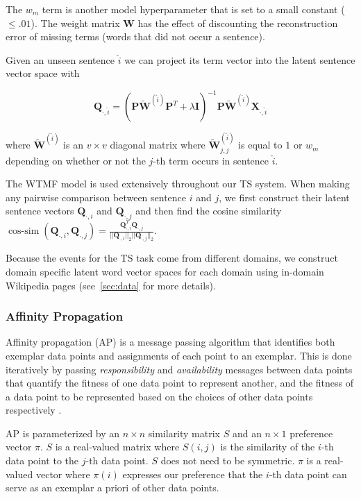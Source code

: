 The $w_m$ term is another model hyperparameter that is set to a small constant
($\le .01$). The weight matrix $\mathbf{W}$ has the effect of discounting the
reconstruction error of missing terms (words that did not occur a sentence).

Given an unseen sentence $\hat{i}$ we can project its term vector into the
latent sentence vector space with 

$$
\mathbf{Q}_{\cdot,\hat{i}} = (\mathbf{P}\mathbf{\tilde{W}}^{(\hat{i})}
\mathbf{P}^T  + \lambda\mathbf{I} )^{-1} 
\mathbf{P}\mathbf{\tilde{W}}^{(\hat{i})} \mathbf{X}_{\cdot, \hat{i}}
$$  

where $\mathbf{\tilde{W}}^{(\hat{i})}$ is an $v\times v$ diagonal matrix
where $\mathbf{\tilde{W}}^{(\hat{i})}_{j,j}$ is equal to $1$ or $w_m$ 
depending on whether or not the $j$-th term occurs in sentence $\hat{i}$.


The WTMF model is used extensively throughout our TS system. When making any 
pairwise comparison between sentence $i$ and $j$, we first construct
their latent sentence vectors $\mathbf{Q}_{\cdot,i}$ and
$\mathbf{Q}_{\cdot,j}$ and then find the cosine similarity 
$\displaystyle \operatorname{cos-sim}
(\mathbf{Q}_{\cdot,i}, \mathbf{Q}_{\cdot,j}) = 
\frac{\mathbf{Q}_{\cdot,i}^T\mathbf{Q}_{\cdot,j}}{||\mathbf{Q}_{\cdot,i}||_2
||\mathbf{Q}_{\cdot,j}||_2   }$.


Because the events for the TS task come from different domains, we construct
domain specific latent word vector spaces for each domain using in-domain 
Wikipedia pages (see~\cref{sec:data} for more details).


\subsubsection{Affinity Propagation}
Affinity propagation (AP) is a message passing algorithm that identifies both
exemplar data points and assignments of each point to an exemplar.  This is
done iteratively by passing \emph{responsibility} and \emph{availability}
messages between data points that quantify the fitness of one data point to
represent another, and the fitness of a data point to be represented based on
the choices of other data points respectively \cite{dueck2007non}.

AP is parameterized by an $n\times n$ similarity matrix $S$ and an $n\times 1$
preference vector $\pi$.  $S$ is a real-valued matrix where $S(i,j)$ is the
similarity of the $i$-th data point to the $j$-th data point.  $S$ does not
need to be symmetric.  $\pi$ is a real-valued vector where $\pi(i)$ expresses
our preference that the $i$-th data point can serve as an exemplar a priori of
other data points. 




